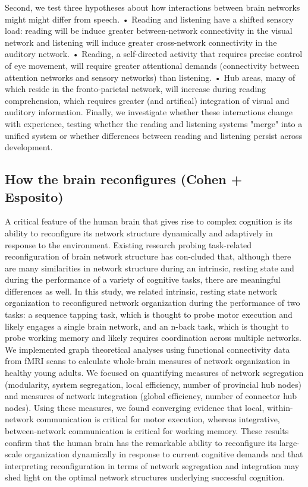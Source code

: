Second, we test three hypotheses about how interactions between brain networks might might differ from speech.
•	Reading and listening have a shifted sensory load: reading will be induce greater between-network connectivity in the visual network and listening will induce greater cross-network connectivity in the auditory network.  
•	Reading, a self-directed activity that requires precise control of eye movement, will require greater attentional demands (connectivity between attention networks and sensory networks) than listening. 
•	Hub areas, many of which reside in the fronto-parietal network, will increase during reading comprehension, which requires greater (and artifical) integration of visual and auditory information.
Finally, we investigate whether these interactions change with experience, testing whether the reading and listening systems "merge" into a unified system or whether differences between reading and listening persist across development.





\subsection{How the brain reconfigures (Cohen + Esposito)}
A critical feature of the human brain that gives rise to complex cognition is its ability to reconfigure its network structure dynamically and adaptively in response to the environment. Existing research probing task-related reconfiguration of brain network structure has con-cluded that, although there are many similarities in network structure during an intrinsic, resting state and during the performance of a variety of cognitive tasks, there are meaningful differences as well. In this study, we related intrinsic, resting state network organization to reconfigured network organization during the performance of two tasks: a sequence tapping task, which is thought to probe motor execution and likely engages a single brain network, and an n-back task, which is thought to probe working memory and likely requires coordination across multiple networks. We implemented graph theoretical analyses using functional connectivity data from fMRI scans to calculate whole-brain measures of network organization in healthy young adults. We focused on quantifying measures of network segregation (modularity, system segregation, local efficiency, number of provincial hub nodes) and measures of network integration (global efficiency, number of connector hub nodes). Using these measures, we found converging evidence that local, within-network communication is critical for motor execution, whereas integrative, between-network communication is critical for working memory. These results confirm that the human brain has the remarkable ability to reconfigure its large-scale organization dynamically in response to current cognitive demands and that interpreting reconfiguration in terms of network segregation and integration may shed light on the optimal network structures underlying successful cognition.




